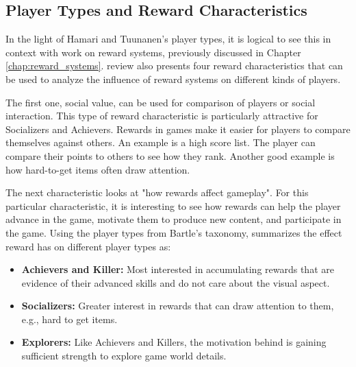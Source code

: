 \subsection{Player Types and Reward Characteristics}
In the light of Hamari and Tuunanen’s player types, it is logical to see this in context with \citet{wang_game_2011} work on reward systems, previously discussed in Chapter \ref{chap:reward_systems}. \citet{wang_game_2011} review also presents four reward characteristics that can be used to analyze the influence of reward systems on different kinds of players.

The first one, social value, can be used for comparison of players or social interaction. This type of reward characteristic is particularly attractive for Socializers and Achievers. Rewards in games make it easier for players to compare themselves against others. An example is a high score list. The player can compare their points to others to see how they rank. Another good example is how hard-to-get items often draw attention. 

The next characteristic looks at "how rewards affect gameplay". For this particular characteristic, it is interesting to see how rewards can help the player advance in the game, motivate them to produce new content, and participate in the game. Using the player types from Bartle’s taxonomy, \citet{wang_game_2011} summarizes the effect reward has on different player types as:

\begin{itemize}
    \item \textbf{Achievers and Killer:} Most interested in accumulating rewards that are evidence of their advanced skills and do not care about the visual aspect.
    \item \textbf{Socializers:} Greater interest in rewards that can draw attention to them, e.g., hard to get items.
    \item \textbf{Explorers:} Like Achievers and Killers, the motivation behind is gaining sufficient strength to explore game world details.
\end{itemize}

